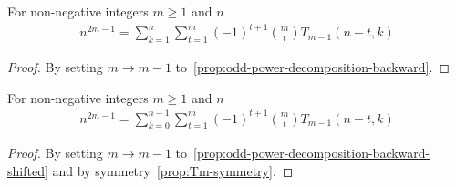 \begin{corollary}
    For non-negative integers $m\geq 1$ and $n$
    \label{cor:odd-power-decomposition-m-1}
    \begin{align*}
        n^{2m-1} = \sum_{k=1}^{n} \sum_{t=1}^{m} (-1)^{t+1} \binom{m}{t} T_{m-1} (n-t, k)
    \end{align*}
    \begin{proof}
        By setting $m \rightarrow m-1$ to~\eqref{prop:odd-power-decomposition-backward}.
    \end{proof}
\end{corollary}

\begin{corollary}
    \label{cor:odd-power-decomposition-m-1-shifted}
    For non-negative integers $m\geq 1$ and $n$
    \begin{align*}
        n^{2m-1} = \sum_{k=0}^{n-1} \sum_{t=1}^{m} (-1)^{t+1} \binom{m}{t} T_{m-1} (n-t, k)
    \end{align*}
    \begin{proof}
        By setting $m \rightarrow m-1$ to~\eqref{prop:odd-power-decomposition-backward-shifted}
        and by symmetry~\eqref{prop:Tm-symmetry}.
    \end{proof}
\end{corollary}
